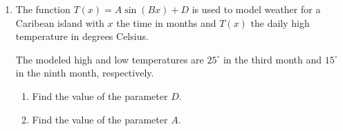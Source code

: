\documentclass[12pt, twoside]{article}
\begin{document}
\begin{enumerate}
\item The function $T(x)=A \sin (Bx)+D$ is used to model weather for a Caribean island with $x$ the time in months and $T(x)$ the daily high temperature in degrees Celsius.
  
  \begin{center}
    \end{center}
    The modeled high and low temperatures are $25^\circ$ in the third month and $15^\circ$ in the ninth month, respectively.
    \begin{enumerate}
      \item Find the value of the parameter $D$. \vspace{1cm}
      \item Find the value of the parameter $A$.
      \end{enumerate}

\end{enumerate}
\end{document}
